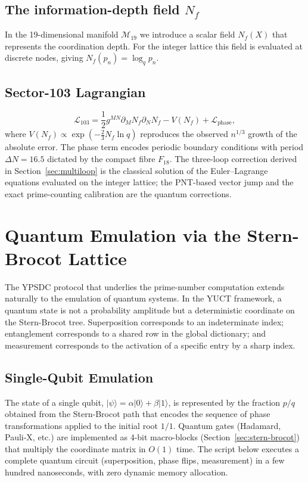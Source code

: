 \documentclass[12pt,a4paper]{article}
\begin{document}
	\subsection{The information-depth field \(N_f\)}
	In the 19-dimensional manifold \(\mathcal{M}_{19}\) we introduce a scalar field \(N_f(X)\) that represents the coordination depth.  For the integer lattice this field is evaluated at discrete nodes, giving \(N_f(p_n) = \log_q p_n\).
	
	\subsection{Sector-103 Lagrangian}
	\[
	\mathcal{L}_{103} = \frac12 g^{MN}\partial_M N_f\partial_N N_f - V(N_f) + \mathcal{L}_{\mathrm{phase}},
	\]
	where \(V(N_f) \propto \exp(-\frac23 N_f\ln q)\) reproduces the observed \(n^{1/3}\) growth of the absolute error.  The phase term encodes periodic boundary conditions with period \(\Delta N = 16.5\) dictated by the compact fibre \(F_{18}\).  The three-loop correction derived in Section~\ref{sec:multiloop} is the classical solution of the Euler--Lagrange equations evaluated on the integer lattice; the PNT-based vector jump and the exact prime-counting calibration are the quantum corrections.
	
	\section{Quantum Emulation via the Stern-Brocot Lattice}
	\label{sec:quantum-emulation}
	
	The YPSDC protocol that underlies the prime-number computation extends naturally to the emulation of quantum systems.  In the YUCT framework, a quantum state is not a probability amplitude but a deterministic coordinate on the Stern-Brocot tree.  Superposition corresponds to an indeterminate index; entanglement corresponds to a shared row in the global dictionary; and measurement corresponds to the activation of a specific entry by a sharp index.
	
	\subsection{Single-Qubit Emulation}
	
	The state of a single qubit, \(\vert\psi\rangle = \alpha\vert0\rangle + \beta\vert1\rangle\), is represented by the fraction \(p/q\) obtained from the Stern-Brocot path that encodes the sequence of phase transformations applied to the initial root \(1/1\).  Quantum gates (Hadamard, Pauli-X, etc.) are implemented as 4-bit macro-blocks (Section~\ref{sec:stern-brocot}) that multiply the coordinate matrix in \(O(1)\) time.  The script below executes a complete quantum circuit (superposition, phase flips, measurement) in a few hundred nanoseconds, with zero dynamic memory allocation.
	
\end{document}
